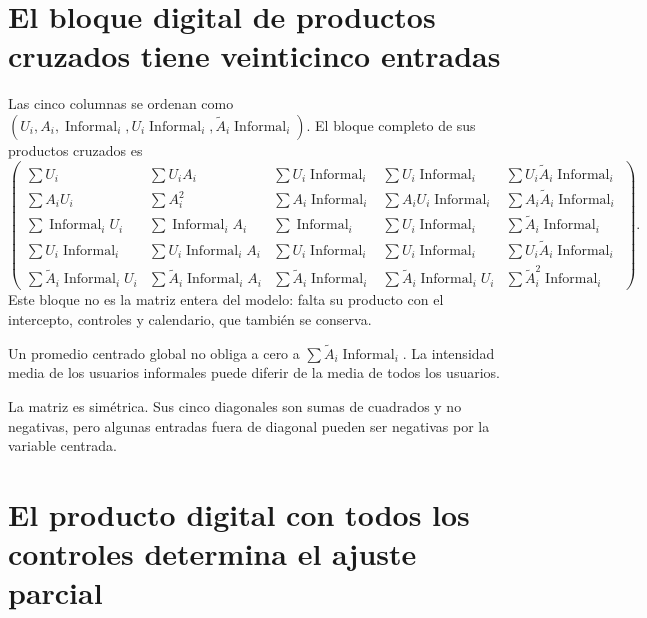 \documentclass[11pt,a4paper]{article}
\begin{document}
\clearpage
\section{El bloque digital de productos cruzados tiene veinticinco entradas}

Las cinco columnas se ordenan como
$(U_i,A_i,\operatorname{Informal}_i,U_i\operatorname{Informal}_i,
\widetilde A_i\operatorname{Informal}_i)$.
El bloque completo de sus productos cruzados es
{\scriptsize\[\begin{pmatrix}
\sum U_i&\sum U_iA_i&\sum U_i\operatorname{Informal}_i&\sum U_i\operatorname{Informal}_i&\sum U_i\widetilde A_i\operatorname{Informal}_i\\
\sum A_iU_i&\sum A_i^2&\sum A_i\operatorname{Informal}_i&\sum A_iU_i\operatorname{Informal}_i&\sum A_i\widetilde A_i\operatorname{Informal}_i\\
\sum \operatorname{Informal}_iU_i&\sum \operatorname{Informal}_iA_i&\sum \operatorname{Informal}_i&\sum U_i\operatorname{Informal}_i&\sum\widetilde A_i\operatorname{Informal}_i\\
\sum U_i\operatorname{Informal}_i&\sum U_i\operatorname{Informal}_iA_i&\sum U_i\operatorname{Informal}_i&\sum U_i\operatorname{Informal}_i&\sum U_i\widetilde A_i\operatorname{Informal}_i\\
\sum \widetilde A_i\operatorname{Informal}_iU_i&\sum\widetilde A_i\operatorname{Informal}_iA_i&\sum\widetilde A_i\operatorname{Informal}_i&
\sum\widetilde A_i\operatorname{Informal}_iU_i&\sum\widetilde A_i^2\operatorname{Informal}_i
\end{pmatrix}.
\]}
Este bloque no es la matriz entera del modelo: falta su producto con el intercepto, controles y calendario, que también se conserva.

Un promedio centrado global no obliga a cero a $\sum\widetilde A_i\operatorname{Informal}_i$. La intensidad media de los usuarios informales puede diferir de la media de todos los usuarios.

La matriz es simétrica. Sus cinco diagonales son sumas de cuadrados y no negativas, pero algunas entradas fuera de diagonal pueden ser negativas por la variable centrada.

\clearpage
\section{El producto digital con todos los controles determina el ajuste parcial}
\end{document}
